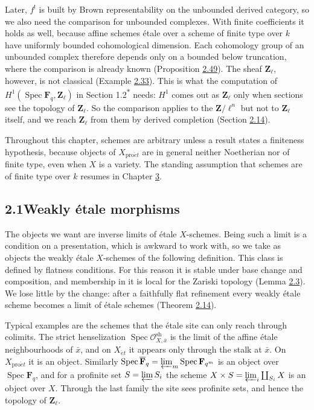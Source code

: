 \documentclass[11pt]{article}
\newcommand{\bpout}[1]{#1\textsuperscript{\hyperlink{bp-outside}{\ensuremath{\ast}}}}
\begin{document}
Later, \(f^!\) is built by Brown representability on the unbounded derived category, so we also need the comparison for unbounded complexes. With finite coefficients it holds as well, because affine schemes étale over a scheme of finite type over \(k\) have uniformly bounded cohomological dimension. Each cohomology group of an unbounded complex therefore depends only on a bounded below truncation, where the comparison is already known (Proposition \hyperref[bp146]{2.49}). The sheaf \(\mathbf Z_\ell\), however, is not classical (Example \hyperref[bp97]{2.33}). This is what the computation of \(H^1(\operatorname{Spec}\mathbf F_q,\mathbf Z_\ell)\) in Section \bpout{1.2} needs: \(H^1\) comes out as \(\mathbf Z_\ell\) only when sections see the topology of \(\mathbf Z_\ell\). So the comparison applies to the \(\mathbf Z/\ell^n\) but not to \(\mathbf Z_\ell\) itself, and we reach \(\mathbf Z_\ell\) from them by derived completion (Section \hyperref[bp179]{2.14}).

Throughout this chapter, schemes are arbitrary unless a result states a finiteness hypothesis, because objects of \(X_{\mathrm{pro}\acute{e}t}\) are in general neither Noetherian nor of finite type, even when \(X\) is a variety. The standing assumption that schemes are of finite type over \(k\) resumes in Chapter \hyperref[bp193]{3}.

\subsection*{\texorpdfstring{2.1\quad Weakly étale morphisms}{2.1 Weakly étale morphisms}}
\label{bp5}%
\label{bp6}%
The objects we want are inverse limits of étale \(X\)-schemes. Being such a limit is a condition on a presentation, which is awkward to work with, so we take as objects the weakly étale \(X\)-schemes of the following definition. This class is defined by flatness conditions. For this reason it is stable under base change and composition, and membership in it is local for the Zariski topology (Lemma \hyperref[bp12]{2.3}). We lose little by the change: after a faithfully flat refinement every weakly étale scheme becomes a limit of étale schemes (Theorem \hyperref[bp42]{2.14}).

Typical examples are the schemes that the étale site can only reach through colimits. The strict henselization \(\operatorname{Spec}\mathcal O^{\mathrm{sh}}_{X,\bar x}\) is the limit of the affine étale neighbourhoods of \(\bar x\), and on \(X_{\acute{e}t}\) it appears only through the stalk at \(\bar x\). On \(X_{\mathrm{pro}\acute{e}t}\) it is an object. Similarly \(\operatorname{Spec}\overline{\mathbf F}_q=\varprojlim_m\operatorname{Spec}\mathbf F_{q^m}\) is an object over \(\operatorname{Spec}\mathbf F_q\), and for a profinite set \(S=\varprojlim S_i\) the scheme \(X\times S=\varprojlim_i\coprod_{S_i}X\) is an object over \(X\). Through the last family the site sees profinite sets, and hence the topology of \(\mathbf Z_\ell\).
\end{document}
